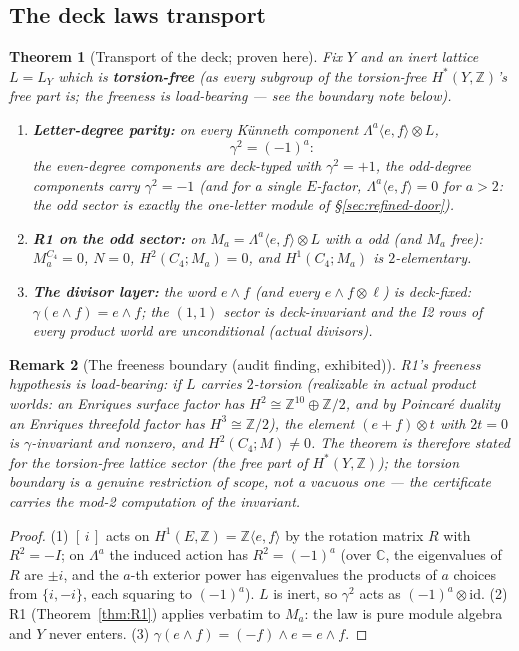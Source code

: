 \documentclass[11pt]{article}
\newcommand{\C}{\mathbb C}
\newcommand{\Z}{\mathbb Z}
\newtheorem{theorem}{Theorem}[section]
\newtheorem{remark}[theorem]{Remark}
\begin{document}
\subsection{The deck laws transport}

\begin{theorem}[Transport of the deck; proven here]\label{thm:transport}
Fix $Y$ and an inert lattice $L=L_Y$ which is \textbf{torsion-free}
(as every subgroup of the torsion-free $H^\ast(Y,\Z)$'s free part is; the
freeness is load-bearing --- see the boundary note below).
\begin{enumerate}
\item \textbf{Letter-degree parity:} on every Künneth component
$\Lambda^a\langle e,f\rangle\otimes L$,
\[
\gamma^2=(-1)^a :
\]
the even-degree components are deck-typed with $\gamma^2=+1$, the
odd-degree components carry $\gamma^2=-1$ (and for a single $E$-factor,
$\Lambda^a\langle e,f\rangle=0$ for $a>2$: the odd sector is exactly the
one-letter module of \S\ref{sec:refined-door}).
\item \textbf{R1 on the odd sector:} on
$M_a=\Lambda^a\langle e,f\rangle\otimes L$ with $a$ odd
(and $M_a$ free):
$M_a^{C_4}=0$, $N=0$, $H^2(C_4;M_a)=0$, and $H^1(C_4;M_a)$ is
$2$-elementary.
\item \textbf{The divisor layer:} the word $e\wedge f$ (and every
$e\wedge f\otimes\ell$) is deck-fixed: $\gamma(e\wedge f)=e\wedge f$; the
$(1,1)$ sector is deck-invariant and the I2 rows of every product world
are unconditional (actual divisors).
\end{enumerate}
\end{theorem}

\begin{remark}[The freeness boundary (audit finding, exhibited)]
R1's freeness hypothesis is load-bearing: if $L$ carries $2$-torsion
(realizable in actual product worlds: an Enriques surface factor has
$H^2\cong\Z^{10}\oplus\Z/2$, and by Poincaré duality an Enriques
threefold factor has $H^3\cong\Z/2$), the element
$(e+f)\otimes t$ with $2t=0$ is $\gamma$-invariant and nonzero, and
$H^2(C_4;M)\neq0$. The theorem is therefore stated for the torsion-free
lattice sector (the free part of $H^\ast(Y,\Z)$); the torsion boundary is
a genuine restriction of scope, not a vacuous one --- the certificate
carries the mod-2 computation of the invariant.
\end{remark}

\begin{proof}
(1) $[\,i\,]$ acts on $H^1(E,\Z)=\Z\langle e,f\rangle$ by the rotation
matrix $R$ with $R^2=-I$; on $\Lambda^a$ the induced action has
$R^2=(-1)^a$ (over $\C$, the eigenvalues of $R$ are $\pm i$, and the $a$-th
exterior power has eigenvalues the products of $a$ choices from
$\{i,-i\}$, each squaring to $(-1)^a$). $L$ is inert, so $\gamma^2$ acts
as $(-1)^a\otimes\mathrm{id}$. (2) R1 (Theorem~\ref{thm:R1}) applies
verbatim to $M_a$: the law is pure module algebra and $Y$ never enters.
(3) $\gamma(e\wedge f)=(-f)\wedge e=e\wedge f$.
\end{proof}
\end{document}

